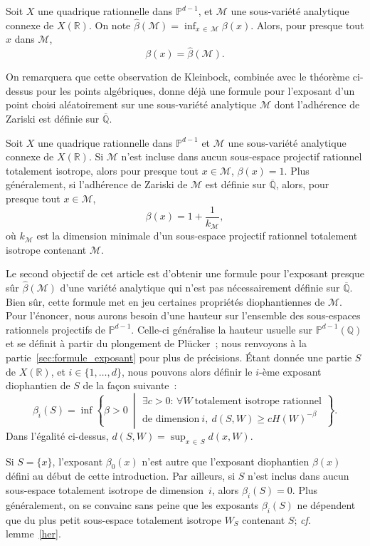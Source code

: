 \documentclass[AHL,Unicode,longabstracts,francais,published]{cedram}
\newcommand{\se}[2]{\{#1,\dots,#2\}}
\newcommand{\R}{\mathbb{R}}
\newcommand{\Q}{\mathbb{Q}}
\newcommand{\PP}{\mathbb{P}}
\newcommand{\QQ}{\overline{\mathbb{Q}}}
\newcommand{\cM}{\mathcal{M}}
\newcommand{\bbeta}{\widehat{\beta}}
\let\oldexists\exists
\renewcommand*{\exists}{\mathrel{\oldexists}}
\let\oldforall\forall
\renewcommand*{\forall}{\mathrel{\oldforall}}
\begin{document}
\begin{theo}\label{exexpi}
Soit $X$ une quadrique rationnelle dans $\PP^{d-1}$, et $\cM$ une sous-variété analytique connexe de $X(\R)$. On note $\bbeta(\cM)=\inf_{x\,\in\,\cM}\beta(x)$. Alors, pour presque tout $x$ dans $\cM$,
\[
\beta(x) = \bbeta(\cM).
\]
\end{theo}

On remarquera que cette observation de Kleinbock, combinée avec le théorème ci-dessus pour les points algébriques, donne déjà une formule pour l'exposant d'un point choisi aléatoirement sur une sous-variété analytique $\cM$ dont l'adhérence de Zariski est définie sur $\QQ$.

\begin{theo}[Exposant d'un ensemble algébrique défini sur $\QQ$]\label{algi}
Soit $X$ une quadrique rationnelle dans $\PP^{d-1}$ et $\cM$ une sous-variété analytique connexe de $X(\R)$. Si $\cM$ n'est incluse dans aucun sous-espace projectif rationnel totalement isotrope, alors pour presque tout $x\in\cM$, $\beta(x)=1$. Plus généralement, si l'adhérence de Zariski de $\cM$ est définie sur $\QQ$, alors, pour presque tout $x\in\cM$,
\[
\beta(x) = 1 + \frac{1}{k_{\cM}},
\]
où $k_{\cM}$ est la dimension minimale d'un sous-espace projectif rationnel totalement isotrope contenant $\cM$.
\end{theo}


Le second objectif de cet article est d'obtenir une formule pour l'exposant presque sûr $\bbeta(\cM)$ d'une variété analytique qui n'est pas nécessairement définie sur $\QQ$. Bien sûr, cette formule met en jeu certaines propriétés diophantiennes de $\cM$. Pour l'énoncer, nous aurons besoin d'une hauteur sur l'ensemble des sous-espaces rationnels projectifs de $\PP^{d-1}$. Celle-ci généralise la hauteur usuelle sur $\PP^{d-1}(\Q)$ et se définit à partir du plongement de Pl\"ucker~; nous renvoyons à la partie~\ref{sec:formule_exposant} pour plus de précisions. Étant donnée une partie $S$ de $X(\R)$, et $i\in\se{1}{d}$, nous pouvons alors définir le $i$-ème exposant diophantien de $S$ de la façon suivante~:
\[
\beta_i(S) = \inf\left\{\beta>0\ \middle|
\begin{split}
\exists c>0:\,\forall W\ \mbox{totalement isotrope rationnel}\\
\mbox{de dimension}\ i,\ d(S,W)\geq cH(W)^{-\beta}
\end{split}
\right\}.
\]
Dans l'égalité ci-dessus, $d(S,W)=\sup_{x\,\in\,S} d(x,W)$.

\begin{rema}
Si $S=\{x\}$, l'exposant $\beta_0(x)$ n'est autre que l'exposant diophantien $\beta(x)$ défini au début de cette introduction. Par ailleurs, si $S$ n'est inclus dans aucun sous-espace totalement isotrope de dimension~$i$, alors $\beta_i(S)=0$. Plus généralement, on se convainc sans peine que les exposants $\beta_i(S)$ ne dépendent que du plus petit sous-espace totalement isotrope $W_S$ contenant $S$; \emph{cf.} lemme~\ref{her}.
\end{rema}
\end{document}
